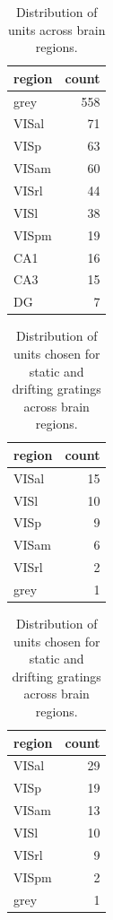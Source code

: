 \documentclass[10pt,twocolumn]{article}
\begin{document}
\begin{table}[H]
  \centering
  \begin{tabular}{lr}
    \toprule
    region & count \\
    \midrule
    grey   & 558 \\
    VISal  &  71 \\
    VISp   &  63 \\
    VISam  &  60 \\
    VISrl  &  44 \\
    VISl   &  38 \\
    VISpm  &  19 \\
    CA1    &  16 \\
    CA3    &  15 \\
    DG     &   7 \\
    \bottomrule
  \end{tabular}
  \caption{Distribution of units across brain regions.}
  \label{tab:regions}
\end{table}

\begin{table}[h]
  \centering
  \begin{subtable}[t]{0.48\linewidth}
    \centering
    \begin{tabular}{lr}
      \toprule
      region & count \\
      \midrule
      VISal & 15 \\
      VISl & 10 \\
      VISp & 9 \\
      VISam & 6 \\
      VISrl & 2 \\
      grey & 1 \\
      \bottomrule
    \end{tabular}
    \caption{Static gratings}
    \label{tab:chosen-static}
  \end{subtable}
  \hfill
  \begin{subtable}[t]{0.48\linewidth}
    \centering
    \begin{tabular}{lr}
      \toprule
      region & count \\
      \midrule
      VISal & 29 \\
      VISp & 19 \\
      VISam & 13 \\
      VISl & 10 \\
      VISrl & 9 \\
      VISpm & 2 \\
      grey & 1 \\
      \bottomrule
    \end{tabular}
    \caption{Drifting gratings}
    \label{tab:chosen-drifting}
  \end{subtable}
  \caption{Distribution of units chosen for static and drifting gratings across brain regions.}
  \label{tab:chosen-regions-combined}
\end{table}
\end{document}
